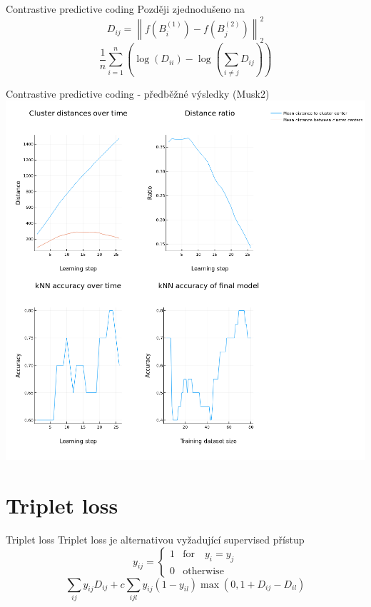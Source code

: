 \documentclass[10pt]{beamer}
\begin{document}
\begin{frame}{Contrastive predictive coding}
	Později zjednodušeno na
	\[ D_{ij} = \left\lVert f \left( B_i^{(1)} \right) - f \left( B_j^{(2)} \right) \right\rVert_2^2 \]
	\[ \frac{1}{n} \sum_{i = 1}^n \left( \log \left( D_{ii} \right) - \log \left( \sum_{i \neq j} D_{ij} \right) \right) \]
\end{frame}

\begin{frame}{Contrastive predictive coding - předběžné výsledky (Musk2)}
	\centering
	\includegraphics[width=0.7\pagewidth]{images/CPC.png}
\end{frame}

\section{Triplet loss}

\begin{frame}{Triplet loss}
	Triplet loss je alternativou vyžadující supervised přístup
	\[ y_{ij} =
\begin{cases}
	1 &\text{for} \quad y_i = y_j \\
	0 &\text{otherwise}
\end{cases}
\]
\[ \sum_{ij} y_{ij} D_{ij} + c \sum_{ijl} y_{ij} \left( 1 - y_{il} \right) \max \left( 0, 1 + D_{ij} - D_{il} \right) \]
\end{frame}
\end{document}
